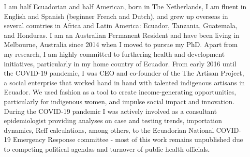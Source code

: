 \documentclass[11pt,a4paper,]{awesome-cv}
\begin{document}
I am half Ecuadorian and half American, born in The Netherlands, I am
fluent in English and Spanish (beginner French and Dutch), and grew up
overseas in several countries in Africa and Latin America: Ecuador,
Tanzania, Guatemala, and Honduras. I am an Australian Permanent Resident
and have been living in Melbourne, Australia since 2014 when I moved to
pursue my PhD. Apart from my research, I am highly committed to
furthering health and development initiatives, particularly in my home
country of Ecuador. From early 2016 until the COVID-19 pandemic, I was
CEO and co-founder of the The Artisan Project, a social enterprise that
worked hand in hand with talented indigenous artisans in Ecuador. We
used fashion as a tool to create income-generating opportunities,
particularly for indigenous women, and impulse social impact and
innovation. During the COVID-19 pandemic I was actively involved as a
consultant epidemiologist providing analyses on case and testing trends,
importation dynamics, Reff calculations, among others, to the Ecuadorian
National COVID-19 Emergency Response committee - most of this work
remains unpublished due to competing political agendas and turnover of
public health officials.


\label{LastPage}~
\end{document}
